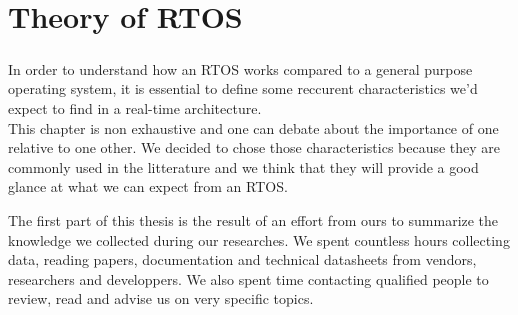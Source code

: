 \chapter{Theory of RTOS\label{part:rtos-theory}}

\paragraph{}
In order to understand how an RTOS works compared to a general purpose operating system,
    it is essential to define some reccurent characteristics we'd expect to find in a real-time architecture.
\\
This chapter is non exhaustive and one can debate about the importance of one relative to one other.
We decided to chose those characteristics because they are commonly used in the litterature
    and we think that they will provide a good glance at what we can expect from an RTOS.

The first part of this thesis is the result of an effort from ours to summarize the knowledge we collected during our researches.
We spent countless hours collecting data, reading papers, documentation and technical datasheets from vendors, researchers and developpers.
We also spent time contacting qualified people to review, read and advise us on very specific topics.










